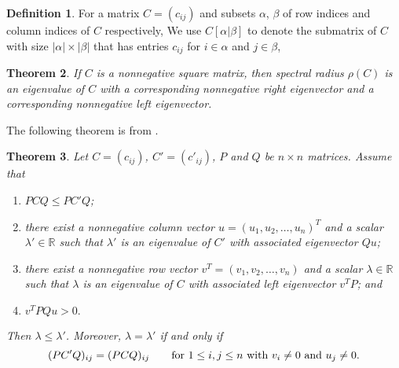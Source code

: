 \documentclass[12pt]{report}%
\theoremstyle{plain}
\newtheorem{thm}{Theorem}[chapter]
\theoremstyle{definition}
\newtheorem{defn}[thm]{Definition}
\begin{document}
 
\begin{defn}For a matrix $C=(c_{ij})$ and subsets $\alpha$, $\beta$ of row indices and column indices of $C$ respectively,  We use $C[\alpha|\beta]$ to denote the submatrix of $C$ with size $ |\alpha| \times |\beta| $ that has entries $c_{ij}$ for $i\in \alpha$ and $j\in\beta$,
\begin{comment}
$C[\alpha|\beta):=C[\alpha|\overline{\beta}],$ where $\overline{\beta}$ is the complement of $\beta$ in the set of column indices, and
similarly, for the definitions of $C(\alpha|\beta]$ and $C(\alpha|\beta).$
 For $\ell\in \mathbb{N},$ $[\ell]:=\{1, 2, \ldots, \ell\},$ symbol $-$ is the complete set of indices, and we use  $i$ to denote the singleton subset $\{i\}$ to reduce the double use of parentheses. For example of the $n\times n$ matrix $C$,
 $C[-|n)=C[[n]|[n-1]]$ is the $n\times (n-1)$ submatrix of $C$ obtained by deleting the last column of $C$.

    The bracket [] and parentheses () can be used together is the notation of sub-matrix, such as $C[k|e)$ or $C(k|e]$.
\end{comment}

\end{defn}

\begin{thm}
        If $C$ is a nonnegative square matrix, then spectral radius $\rho(C)$ is an eigenvalue of $C$ with a corresponding nonnegative right eigenvector and a corresponding nonnegative left eigenvector.
\end{thm}


The following theorem is from \cite{chang}.

\begin{thm}
 Let $C=(c_{ij})$, $C'=(c'_{ij})$, $P$ and $Q$ be  $n\times n$ matrices.
Assume that
\begin{enumerate}
\item[(i)]    $PCQ\leq PC'Q$;
\item[(ii)]  there exist a nonnegative column vector $u=(u_1, u_2, \ldots, u_n)^T$  and a scalar $\lambda'\in \mathbb{R}$ such that $\lambda'$ is an eigenvalue of $C'$ with associated eigenvector $Qu$;
\item[(iii)] there exist a nonnegative row vector $v^T=(v_1, v_2, \ldots, v_n)$  and a scalar $\lambda\in \mathbb{R}$
such that $\lambda$ is an eigenvalue of $C$ with associated  left eigenvector $v^TP$; and
\item[(iv)] $v^TPQu>0.$
\end{enumerate}
 Then $\lambda\leq \lambda'$.
    Moreover, $\lambda=\lambda'$
if and only if
    \begin{equation*}
        \label{e3}
(PC'Q)_{ij}=(PCQ)_{ij}\qquad \hbox{for~}1\leq i, j\leq n \hbox{~with~} v_i\ne 0 \hbox{~and~} u_j\ne 0.
\end{equation*}
\end{thm}
\end{document}
